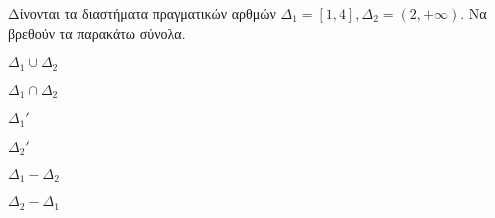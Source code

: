 Δίνονται τα διαστήματα πραγματικών αρθμών $ \varDelta_1=[1,4],\varDelta_2=(2,+\infty) $. Να βρεθούν τα παρακάτω σύνολα.
\begin{multicols}{3}
\begin{alist}
\item $ \varDelta_1\cup\varDelta_2 $
\item $ \varDelta_1\cap\varDelta_2 $
\item $ \varDelta_1' $
\item $ \varDelta_2' $
\item $ \varDelta_1-\varDelta_2 $
\item $ \varDelta_2-\varDelta_1 $
\end{alist}
\end{multicols}
